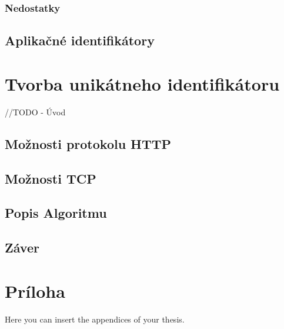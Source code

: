 \documentclass[
  printed, %
  table,   %
  lof,     %
  lot,     %
]{fithesis3}
\begin{document}
\subsection{Nedostatky}
\section{Aplikačné identifikátory}

\chapter{Tvorba unikátneho identifikátoru}
\label{ch:footprint}
//TODO - Úvod
\section{Možnosti protokolu HTTP}
\section{Možnosti TCP}
\section{Popis Algoritmu}

\section{Záver}

\makeatletter\thesis@blocks@clear\makeatother
{} %
\printindex

\appendix %
\chapter{Príloha}
Here you can insert the appendices of your thesis.
\end{document}
